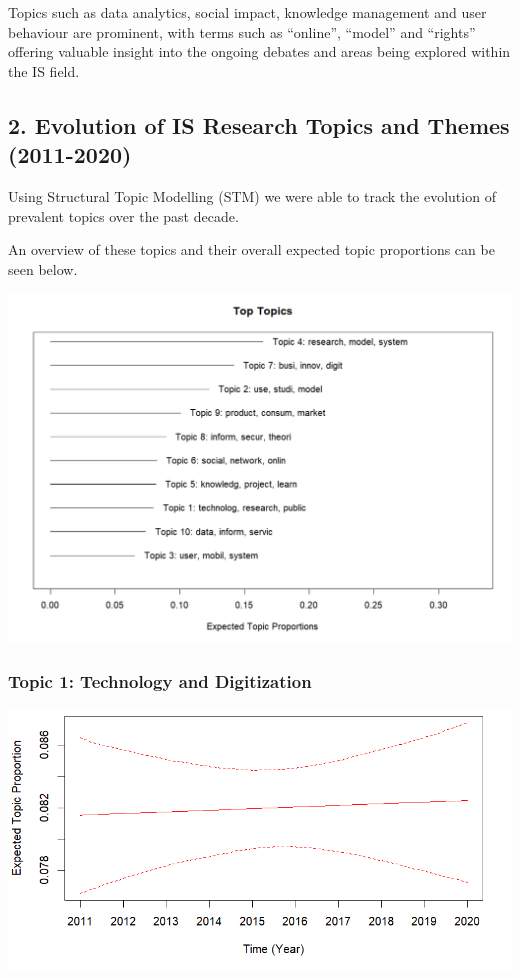 \documentclass[
  letterpaper,
  DIV=11,
  numbers=noendperiod]{scrartcl}
\begin{document}
Topics such as data analytics, social impact, knowledge management and
user behaviour are prominent, with terms such as ``online'', ``model''
and ``rights'' offering valuable insight into the ongoing debates and
areas being explored within the IS field.

\newpage{}

\hypertarget{evolution-of-is-research-topics-and-themes-2011-2020}{%
\subsection{2. Evolution of IS Research Topics and Themes
(2011-2020)}\label{evolution-of-is-research-topics-and-themes-2011-2020}}

Using Structural Topic Modelling (STM) we were able to track the
evolution of prevalent topics over the past decade.

An overview of these topics and their overall expected topic proportions
can be seen below.

\includegraphics{images/STMTopicOverview.png}

\hypertarget{topic-1-technology-and-digitization}{%
\subsubsection{Topic 1: Technology and
Digitization}\label{topic-1-technology-and-digitization}}

\includegraphics{images/topic1.png}
\end{document}
